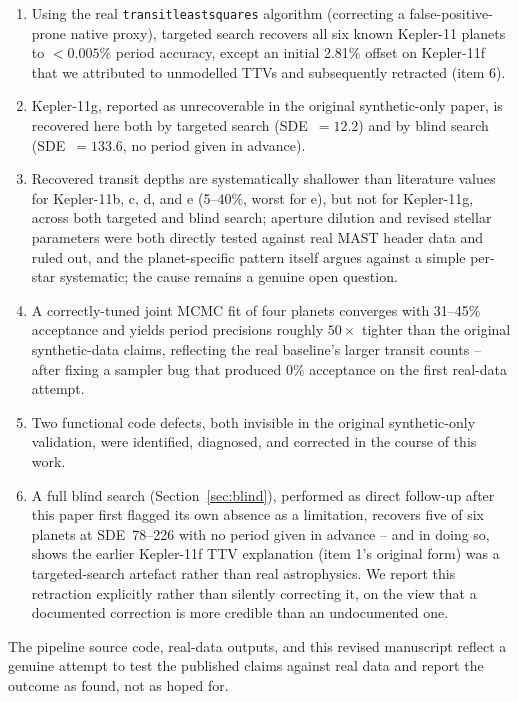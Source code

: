 \documentclass[11pt]{article}
\begin{document}
\begin{enumerate}[leftmargin=*]
\item Using the real \texttt{transitleastsquares} algorithm (correcting a false-positive-prone native proxy), targeted search recovers all six known Kepler-11 planets to $<0.005\%$ period accuracy, except an initial 2.81\% offset on Kepler-11f that we attributed to unmodelled TTVs and subsequently retracted (item 6).
\item Kepler-11g, reported as unrecoverable in the original synthetic-only paper, is recovered here both by targeted search (SDE~$=12.2$) and by blind search (SDE~$=133.6$, no period given in advance).
\item Recovered transit depths are systematically shallower than literature values for Kepler-11b, c, d, and e (5--40\%, worst for e), but not for Kepler-11g, across both targeted and blind search; aperture dilution and revised stellar parameters were both directly tested against real MAST header data and ruled out, and the planet-specific pattern itself argues against a simple per-star systematic; the cause remains a genuine open question.
\item A correctly-tuned joint MCMC fit of four planets converges with 31--45\% acceptance and yields period precisions roughly $50\times$ tighter than the original synthetic-data claims, reflecting the real baseline's larger transit counts -- after fixing a sampler bug that produced 0\% acceptance on the first real-data attempt.
\item Two functional code defects, both invisible in the original synthetic-only validation, were identified, diagnosed, and corrected in the course of this work.
\item A full blind search (Section~\ref{sec:blind}), performed as direct follow-up after this paper first flagged its own absence as a limitation, recovers five of six planets at SDE~78--226 with no period given in advance -- and in doing so, shows the earlier Kepler-11f TTV explanation (item 1's original form) was a targeted-search artefact rather than real astrophysics. We report this retraction explicitly rather than silently correcting it, on the view that a documented correction is more credible than an undocumented one.
\end{enumerate}

The pipeline source code, real-data outputs, and this revised manuscript reflect a genuine attempt to test the published claims against real data and report the outcome as found, not as hoped for.
\end{document}
